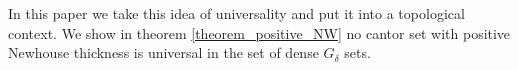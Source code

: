 In this paper we take this idea of universality and put it into a topological context.  We show in theorem \ref{theorem_positive_NW} no cantor set with positive Newhouse thickness is universal in the set of dense $G_\delta$ sets.



